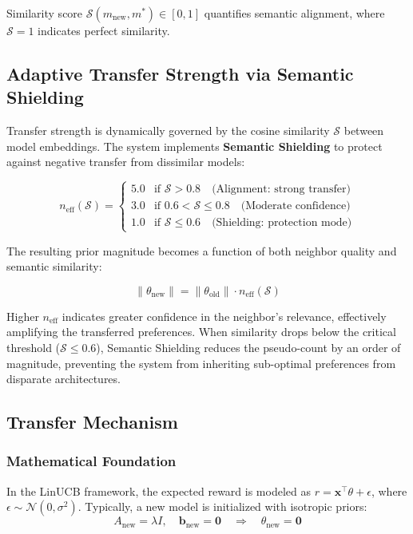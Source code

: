 \documentclass[sigconf,nonacm]{acmart}
\begin{document}
Similarity score $\mathcal{S}(m_{\text{new}}, m^*) \in [0,1]$ quantifies semantic alignment, where $\mathcal{S} = 1$ indicates perfect similarity.

\subsection{Adaptive Transfer Strength via Semantic Shielding}

Transfer strength is dynamically governed by the cosine similarity $\mathcal{S}$ between model embeddings. The system implements \textbf{Semantic Shielding} to protect against negative transfer from dissimilar models:

\begin{equation}
n_{\text{eff}}(\mathcal{S}) = \begin{cases}
5.0 & \text{if } \mathcal{S} > 0.8 \quad \text{(Alignment: strong transfer)} \\
3.0 & \text{if } 0.6 < \mathcal{S} \leq 0.8 \quad \text{(Moderate confidence)} \\
1.0 & \text{if } \mathcal{S} \leq 0.6 \quad \text{(Shielding: protection mode)}
\end{cases}
\end{equation}

The resulting prior magnitude becomes a function of both neighbor quality and semantic similarity:

\begin{equation}
\|\theta_{\text{new}}\| = \|\theta_{\text{old}}\| \cdot n_{\text{eff}}(\mathcal{S})
\end{equation}

Higher $n_{\text{eff}}$ indicates greater confidence in the neighbor's relevance, effectively amplifying the transferred preferences. When similarity drops below the critical threshold ($\mathcal{S} \leq 0.6$), Semantic Shielding reduces the pseudo-count by an order of magnitude, preventing the system from inheriting sub-optimal preferences from disparate architectures.

\subsection{Transfer Mechanism}

\subsubsection{Mathematical Foundation}

In the LinUCB framework, the expected reward is modeled as $r = \mathbf{x}^\top \theta + \epsilon$, where $\epsilon \sim \mathcal{N}(0, \sigma^2)$. Typically, a new model is initialized with isotropic priors:
\begin{equation}
A_{\text{new}} = \lambda I, \quad \mathbf{b}_{\text{new}} = \mathbf{0} \quad \Rightarrow \quad \theta_{\text{new}} = \mathbf{0}
\end{equation}
\end{document}
